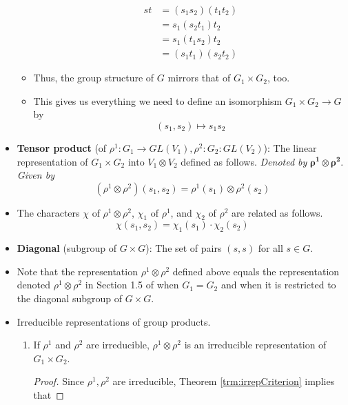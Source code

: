 \documentclass[../notes.tex]{subfiles}
\begin{document}
\begin{itemize}
\begin{itemize}
\begin{align*}
            st &= (s_1s_2)(t_1t_2)\tag*{Condition (i)}\\
            &= s_1(s_2t_1)t_2\\
            &= s_1(t_1s_2)t_2\tag*{Condition (ii)}\\
            &= (s_1t_1)(s_2t_2)
        \end{align*}
        \item Thus, the group structure of $G$ mirrors that of $G_1\times G_2$, too.
        \item This gives us everything we need to define an isomorphism $G_1\times G_2\to G$ by
        \begin{equation*}
            (s_1,s_2) \mapsto s_1s_2
        \end{equation*}
    \end{itemize}
    \item \textbf{Tensor product} (of $\rho^1:G_1\to GL(V_1),\rho^2:G_2:GL(V_2)$): The linear representation of $G_1\times G_2$ into $V_1\otimes V_2$ defined as follows. \emph{Denoted by} $\bm{\rho^1\otimes\rho^2}$. \emph{Given by}
    \begin{equation*}
        (\rho^1\otimes\rho^2)(s_1,s_2) = \rho^1(s_1)\otimes\rho^2(s_2)
    \end{equation*}
    \item The characters $\chi$ of $\rho^1\otimes\rho^2$, $\chi_1$ of $\rho^1$, and $\chi_2$ of $\rho^2$ are related as follows.
    \begin{equation*}
        \chi(s_1,s_2) = \chi_1(s_1)\cdot\chi_2(s_2)
    \end{equation*}
    \item \textbf{Diagonal} (subgroup of $G\times G$): The set of pairs $(s,s)$ for all $s\in G$.
    \item Note that the representation $\rho^1\otimes\rho^2$ defined above equals the representation denoted $\rho^1\otimes\rho^2$ in Section 1.5 of \textcite{bib:Serre} when $G_1=G_2$ and when it is restricted to the diagonal subgroup of $G\times G$.
    \item Irreducible representations of group products.
    \begin{theorem}\leavevmode
        \begin{enumerate}[label={\textup{(\roman*)}}]
            \item If $\rho^1$ and $\rho^2$ are irreducible, $\rho^1\otimes\rho^2$ is an irreducible representation of $G_1\times G_2$.
            \begin{proof}
                Since $\rho^1,\rho^2$ are irreducible, Theorem \ref{trm:irrepCriterion} implies that

\end{proof}
\end{enumerate}
\end{theorem}
\end{itemize}
\end{document}
